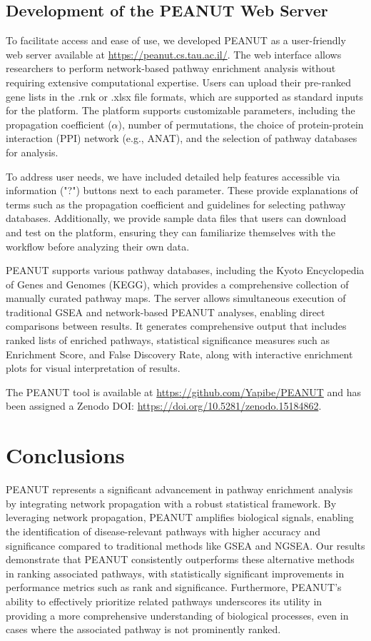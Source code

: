 \documentclass{article}
\begin{document}
\subsection{Development of the PEANUT Web Server}
To facilitate access and ease of use, we developed PEANUT as a user-friendly web server available at \url{https://peanut.cs.tau.ac.il/}. The web interface allows researchers to perform network-based pathway enrichment analysis without requiring extensive computational expertise. Users can upload their pre-ranked gene lists in the .rnk or .xlsx file formats, which are supported as standard inputs for the platform. The platform supports customizable parameters, including the propagation coefficient ($\alpha$), number of permutations, the choice of protein-protein interaction (PPI) network (e.g., ANAT), and the selection of pathway databases for analysis.

To address user needs, we have included detailed help features accessible via information ("?") buttons next to each parameter. These provide explanations of terms such as the propagation coefficient and guidelines for selecting pathway databases. Additionally, we provide sample data files that users can download and test on the platform, ensuring they can familiarize themselves with the workflow before analyzing their own data.

PEANUT supports various pathway databases, including the Kyoto Encyclopedia of Genes and Genomes (KEGG), which provides a comprehensive collection of manually curated pathway maps. The server allows simultaneous execution of traditional GSEA and network-based PEANUT analyses, enabling direct comparisons between results. It generates comprehensive output that includes ranked lists of enriched pathways, statistical significance measures such as Enrichment Score, and False Discovery Rate, along with interactive enrichment plots for visual interpretation of results.

The PEANUT tool is available at \url{https://github.com/Yapibe/PEANUT} and has been assigned a Zenodo DOI: \url{https://doi.org/10.5281/zenodo.15184862}.

\section{Conclusions}
PEANUT represents a significant advancement in pathway enrichment analysis by integrating network propagation with a robust statistical framework. By leveraging network propagation, PEANUT amplifies biological signals, enabling the identification of disease-relevant pathways with higher accuracy and significance compared to traditional methods like GSEA and NGSEA. Our results demonstrate that PEANUT consistently outperforms these alternative methods in ranking associated pathways, with statistically significant improvements in performance metrics such as rank and significance. Furthermore, PEANUT's ability to effectively prioritize related pathways underscores its utility in providing a more comprehensive understanding of biological processes, even in cases where the associated pathway is not prominently ranked.
\end{document}
